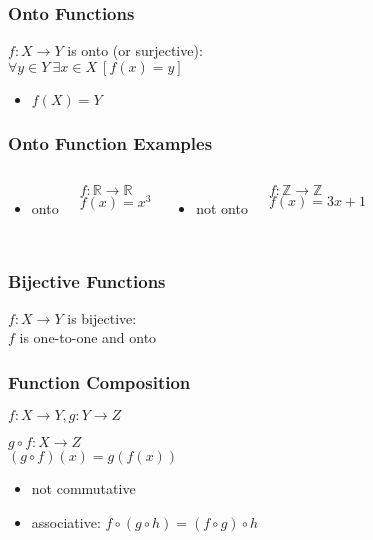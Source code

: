 \documentclass[dvipsnames]{beamer}
\begin{document}
\begin{frame}
  \frametitle{Onto Functions}

  \begin{definition}
    $f: X \rightarrow Y$ is \alert{onto} (or \alert{surjective}):\\
    $\forall y \in Y~\exists x \in X~[f(x)=y]$
  \end{definition}

  \begin{itemize}
    \item $f(X)=Y$
  \end{itemize}
\end{frame}

\begin{frame}
  \frametitle{Onto Function Examples}

  \begin{columns}[t]
    \begin{itemize}
     \item onto
    \end{itemize}

    \medskip
    $f: \mathbb{R} \rightarrow \mathbb{R}$\\
    $f(x) = x^3$

    \pause
    \begin{itemize}
     \item not onto
    \end{itemize}

    \medskip
    $f: \mathbb{Z} \rightarrow \mathbb{Z}$\\
    $f(x) = 3x + 1$
  \end{columns}
\end{frame}

\begin{frame}
  \frametitle{Bijective Functions}

  \begin{definition}
    $f: X \rightarrow Y$ is \alert{bijective}:\\
    $f$ is one-to-one and onto
  \end{definition}
\end{frame}

\begin{frame}
  \frametitle{Function Composition}

  \begin{definition}
    $f: X \rightarrow Y, g: Y \rightarrow Z$

    \medskip
    $g \circ f: X \rightarrow Z$\\
    $(g \circ f)(x) = g(f(x))$
  \end{definition}

  \pause
  \begin{itemize}
    \item not commutative
    \item associative: $f \circ (g \circ h) = (f \circ g) \circ h$
  \end{itemize}
\end{frame}
\end{document}
